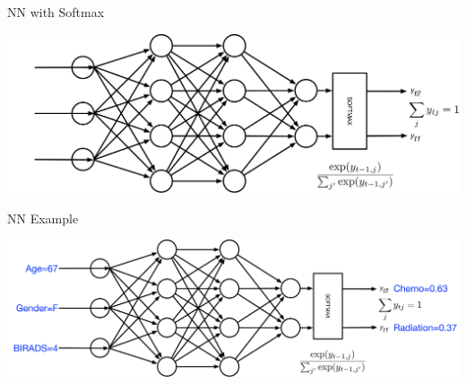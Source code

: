 \documentclass[aspectratio=169]{beamer}
\begin{document}
\begin{frame}{NN with Softmax}

\includegraphics[width=1\textwidth]{lectFF/nnSoftmax.pdf}
\end{frame}
\begin{frame}{NN Example}

\includegraphics[width=1\textwidth]{lectFF/nnExampleSoftmax.pdf}
\end{frame}
\end{document}
